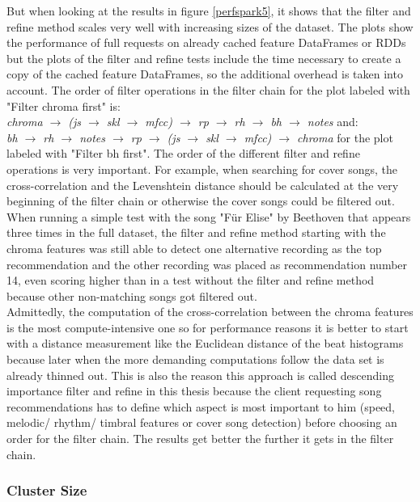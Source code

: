 \noindent But when looking at the results in figure \ref{perfspark5}, it shows that the filter and refine method scales very well with increasing sizes of the dataset. The plots show the performance of full requests on already cached feature DataFrames or RDDs but the plots of the filter and refine tests include the time necessary to create a copy of the cached feature DataFrames, so the additional overhead is taken into account. 
\noindent The order of filter operations in the filter chain for the plot labeled with "Filter chroma first" is:\\
\textit{chroma $\rightarrow$ (js  $\rightarrow$ skl  $\rightarrow$ mfcc) $\rightarrow$ rp  $\rightarrow$ rh  $\rightarrow$ bh  $\rightarrow$ notes} and:\\
\textit{bh $\rightarrow$ rh $\rightarrow$ notes $\rightarrow$ rp $\rightarrow$ (js  $\rightarrow$ skl  $\rightarrow$ mfcc) $\rightarrow$ chroma} for the plot labeled with "Filter bh first".
\noindent The order of the different filter and refine operations is very important. For example, when searching for cover songs, the cross-correlation and the Levenshtein distance should be calculated at the very beginning of the filter chain or otherwise the cover songs could be filtered out. When running a simple test with the song "Für Elise" by Beethoven that appears three times in the full dataset, the filter and refine method starting with the chroma features was still able to detect one alternative recording as the top recommendation and the other recording was placed as recommendation number 14, even scoring higher than in a test without the filter and refine method because other non-matching songs got filtered out.\\
Admittedly, the computation of the cross-correlation between the chroma features is the most compute-intensive one so for performance reasons it is better to start with a distance measurement like the Euclidean distance of the beat histograms because later when the more demanding computations follow the data set is already thinned out. 
This is also the reason this approach is called descending importance filter and refine in this thesis because the client requesting song recommendations has to define which aspect is most important to him (speed, melodic/ rhythm/ timbral features or cover song detection) before choosing an order for the filter chain. The results get better the further it gets in the filter chain.  

\subsubsection{Cluster Size}

